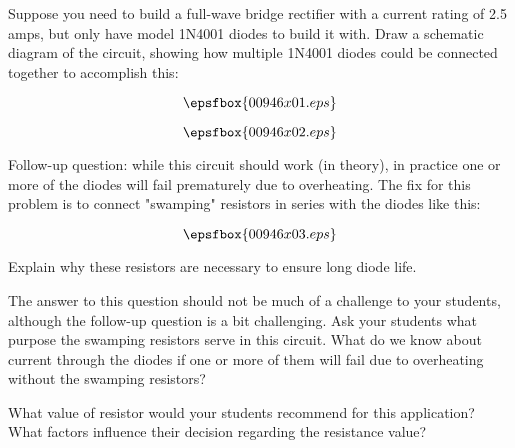 

Suppose you need to build a full-wave bridge rectifier with a current rating of 2.5 amps, but only have model 1N4001 diodes to build it with.  Draw a schematic diagram of the circuit, showing how multiple 1N4001 diodes could be connected together to accomplish this:

$$\epsfbox{00946x01.eps}$$







$$\epsfbox{00946x02.eps}$$

\vskip 10pt

Follow-up question: while this circuit should work (in theory), in practice one or more of the diodes will fail prematurely due to overheating.  The fix for this problem is to connect "swamping" resistors in series with the diodes like this:

$$\epsfbox{00946x03.eps}$$

Explain why these resistors are necessary to ensure long diode life.







The answer to this question should not be much of a challenge to your students, although the follow-up question is a bit challenging.  Ask your students what purpose the swamping resistors serve in this circuit.  What do we know about current through the diodes if one or more of them will fail due to overheating without the swamping resistors?

What value of resistor would your students recommend for this application?  What factors influence their decision regarding the resistance value?




